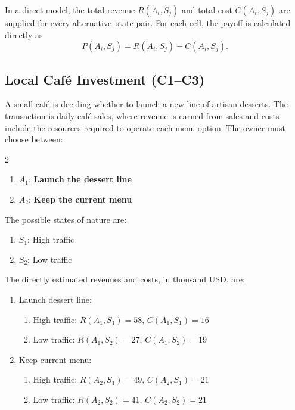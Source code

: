 \vspace{0.8cm}

In a direct model, the total revenue \(R(A_i,S_j)\) and total cost
\(C(A_i,S_j)\) are supplied for every alternative--state pair. For
each cell, the payoff is calculated directly as
\[
P(A_i,S_j)=R(A_i,S_j)-C(A_i,S_j).
\]

\subsection{Local Café Investment (C1--C3)}
\label{sec:problem3-local-cafe-investment-c1-c3}

A small café is deciding whether to launch a new line of artisan desserts.
The transaction is daily café sales, where revenue is earned from sales and
costs include the resources required to operate each menu option. The owner
must choose between:

\begin{multicols}{2}
	\begin{enumerate}[label=\arabic*.]
		\item \(A_1\): \textbf{Launch the dessert line}
		\item \(A_2\): \textbf{Keep the current menu}
	\end{enumerate}
	
	The possible states of nature are:
	\begin{enumerate}[label=\arabic*.]
		\item \(S_1\): High traffic
		\item \(S_2\): Low traffic
	\end{enumerate}
	
	\columnbreak
	
	The directly estimated revenues and costs, in thousand USD, are:
	\begin{enumerate}[label=\arabic*.]
		\item Launch dessert line:
		\begin{enumerate}[label=\roman*)]
			\item High traffic:
			\(R(A_1,S_1)=58\), \(C(A_1,S_1)=16\)
			
			\item Low traffic:
			\(R(A_1,S_2)=27\), \(C(A_1,S_2)=19\)
		\end{enumerate}
		
		\item Keep current menu:
		\begin{enumerate}[label=\roman*)]
			\item High traffic:
			\(R(A_2,S_1)=49\), \(C(A_2,S_1)=21\)
			
			\item Low traffic:
			\(R(A_2,S_2)=41\), \(C(A_2,S_2)=21\)
		\end{enumerate}
	\end{enumerate}
\end{multicols}

